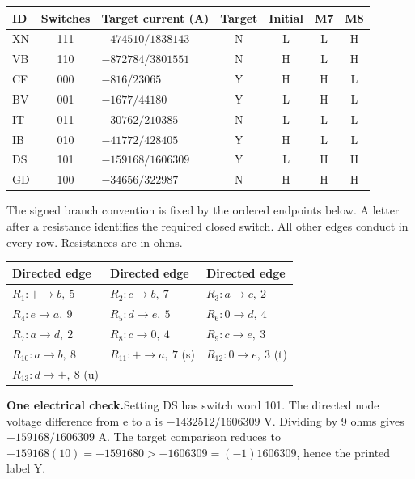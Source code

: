 \documentclass[12pt,letterpaper]{article}
\newcommand{\reading}[2]{\par\smallskip\textsf{\color{accent}\bfseries #1}\enspace #2\par}
\begin{document}
\begin{center}{\small\setlength{\tabcolsep}{4pt}\begin{tabularx}{\linewidth}{@{}lcYcccc@{}}\toprule
ID & Switches & Target current (A) & Target & Initial & M7 & M8\\ \midrule
XN & 111 & $-474510/1838143$ & N & L & L & H\\
VB & 110 & $-872784/3801551$ & N & H & L & H\\
CF & 000 & $-816/23065$ & Y & H & H & L\\
BV & 001 & $-1677/44180$ & Y & L & H & L\\
IT & 011 & $-30762/210385$ & N & L & L & L\\
IB & 010 & $-41772/428405$ & Y & H & L & L\\
DS & 101 & $-159168/1606309$ & Y & L & H & H\\
GD & 100 & $-34656/322987$ & N & H & H & H\\ \bottomrule\end{tabularx}}
\end{center}

The signed branch convention is fixed by the ordered endpoints below. A letter after a resistance identifies the required closed switch. All other edges conduct in every row. Resistances are in ohms.

\begin{center}{\footnotesize\setlength{\tabcolsep}{4pt}\begin{tabularx}{\linewidth}{@{}YYY@{}}\toprule
Directed edge & Directed edge & Directed edge\\ \midrule
$R_{1}\colon +\to b,\ 5$ & $R_{2}\colon c\to b,\ 7$ & $R_{3}\colon a\to c,\ 2$\\
$R_{4}\colon e\to a,\ 9$ & $R_{5}\colon d\to e,\ 5$ & $R_{6}\colon 0\to d,\ 4$\\
$R_{7}\colon a\to d,\ 2$ & $R_{8}\colon c\to 0,\ 4$ & $R_{9}\colon c\to e,\ 3$\\
$R_{10}\colon a\to b,\ 8$ & $R_{11}\colon +\to a,\ 7$ (s) & $R_{12}\colon 0\to e,\ 3$ (t)\\
$R_{13}\colon d\to +,\ 8$ (u) &  & \\ \bottomrule\end{tabularx}}
\end{center}

\reading{One electrical check.}{Setting DS has switch word 101. The directed node voltage difference from e to a is $-1432512/1606309$ V. Dividing by 9 ohms gives $-159168/1606309$ A. The target comparison reduces to $-159168(10)=-1591680 > -1606309=(-1)1606309$, hence the printed label Y.}
\end{document}
